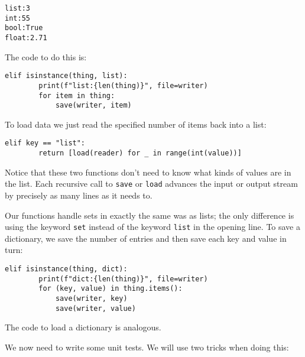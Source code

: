 \documentclass{scrbook}
\begin{document}
\begin{lstlisting}[frame=single,frameround=tttt]
list:3
int:55
bool:True
float:2.71
\end{lstlisting}


The code to do this is:


\begin{lstlisting}[frame=single,frameround=tttt]
    elif isinstance(thing, list):
        print(f"list:{len(thing)}", file=writer)
        for item in thing:
            save(writer, item)
\end{lstlisting}



To load data we just read the specified number of items back into a list:


\begin{lstlisting}[frame=single,frameround=tttt]
    elif key == "list":
        return [load(reader) for _ in range(int(value))]
\end{lstlisting}



Notice that these two functions don't need to know
what kinds of values are in the list.
Each recursive call to \texttt{save} or \texttt{load}
advances the input or output stream
by precisely as many lines as it needs to.


Our functions handle sets in exactly the same was as lists;
the only difference is using the keyword \texttt{set} instead of the keyword \texttt{list}
in the opening line.
To save a dictionary,
we save the number of entries
and then save each key and value in turn:


\begin{lstlisting}[frame=single,frameround=tttt]
    elif isinstance(thing, dict):
        print(f"dict:{len(thing)}", file=writer)
        for (key, value) in thing.items():
            save(writer, key)
            save(writer, value)
\end{lstlisting}



\noindent The code to load a dictionary is analogous.


We now need to write some unit tests.
We will use two tricks when doing this:
\end{document}

